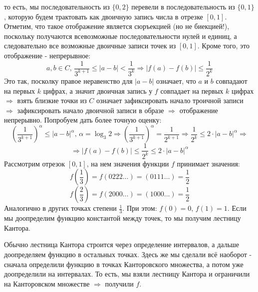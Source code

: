 \documentclass[12pt]{article}
\theoremstyle{definition}
\begin{document}
то есть, мы последовательность из $\{0,2\}$ перевели в последовательность из $\{0,1\}$, которую будем трактовать как двоичную запись числа в отрезке $[0,1]$. Отметим, что такое отображение является сюръекцией (но не биекцией!), поскольку получаются всевозможные последовательности нулей и единиц, а следовательно все возможные двоичные записи точек из $[0,1]$. Кроме того, это отображение - непрерывное:
$$
	a,b \in C, \, \dfrac{1}{3^{k+1}} \leq  |a - b| < \dfrac{1}{3^k} \Rightarrow |f(a) - f(b)| \leq \dfrac{1}{2^k}
$$
Это так, посколку правое неравенство для $|a-b|$ означает, что $a$ и $b$ совпадают на первых $k$ цифрах, а значит двоичная запись у $f$ совпадает на первых $k$ цифрах $\Rightarrow$ взять близкие точки из $C$ означает зафиксировать начало троичной записи $\Rightarrow$ зафиксировать начало двоичной записи в образе $\Rightarrow$ отображение непрерывно. Попробуем дать более точную оценку:
$$
	\left(\dfrac{1}{3^{k+1}}\right)^\alpha \leq |a - b|^\alpha, \, \alpha = \log_3{2} \Rightarrow \left(\dfrac{1}{3^{k+1}}\right)^\alpha = \dfrac{1}{2^{k+1}} \Rightarrow \dfrac{1}{2^k} \leq 2{\cdot}|a - b|^\alpha \Rightarrow
$$
$$
	\Rightarrow |f(a) - f(b)| \leq \dfrac{1}{2^k} \leq 2{\cdot}|a - b|^\alpha
$$
Рассмотрим отрезок $[0,1]$, на нем значения функции $f$ принимает значения:
$$
	f\left(\dfrac{1}{3}\right) = f(0222\dotsc) = (0111\dotsc) = \dfrac{1}{2}
$$
$$
	f\left(\dfrac{2}{3}\right) = f(2000\dotsc) = (1000\dotsc) = \dfrac{1}{2}
$$
Аналогично в других точках степени $\tfrac{1}{3}$. При этом: $f(0) = 0, \, f(1) = 1$. Если мы доопределим функцию константой между точек, то мы получим лестницу Кантора.

Обычно лестница Кантора строится через определение интервалов, а дальше доопределяем функцию в остальных точках. Здесь же мы сделали всё наоборот - сначала определили функцию в точках Канторовского множества, а потом уже доопределили на интервалах. То есть, мы взяли лестницу Кантора и ограничили на Канторовском множестве $\Rightarrow$ получили $f$.
\end{document}
